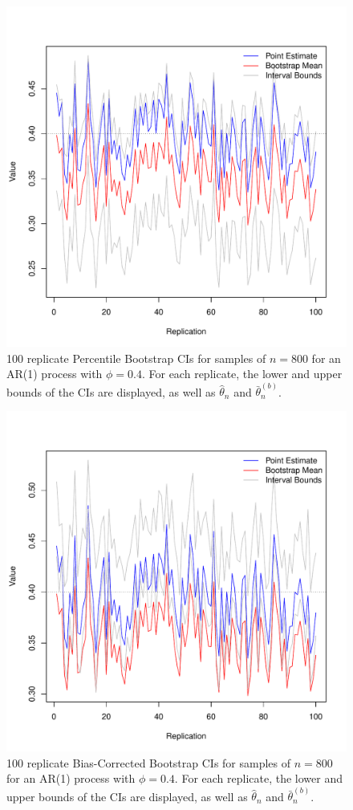 \documentclass[12pt, letterpaper, titlepage]{article}
\begin{document}
\begin{figure}[tbp]
  \centering
  \includegraphics[width=\textwidth]{figures/pct}
  \caption{100 replicate Percentile Bootstrap CIs for samples of $n = 800$ for
  an AR(1) process with $\phi = 0.4$. For each replicate, the lower and upper bounds of the CIs are displayed, as well as $\hat\theta_n$ and $\bar\theta_n^{(b)}$. }
  \label{fig:pct}
\end{figure}

\begin{figure}[tbp]
  \centering
  \includegraphics[width=\textwidth]{figures/bc}
  \caption{100 replicate Bias-Corrected Bootstrap CIs for samples of $n = 800$ for
  an AR(1) process with $\phi = 0.4$. For each replicate, the lower and upper bounds of the CIs are displayed, as well as $\hat\theta_n$ and $\bar\theta_n^{(b)}$.}
  \label{fig:bc}
\end{figure}
\end{document}
